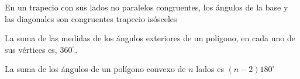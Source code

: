 \begin{teorema}{
En un trapecio con sus lados no paralelos congruentes, los \'angulos de la base
y las diagonales son congruentes
}{trapecio is\'osceles}

\end{teorema}

\begin{teorema}{
La suma de las medidas de los \'angulos exteriores de un pol\'igono, en cada 
uno de sus v\'ertices es, $360^\circ$.
}{}

\end{teorema}
 \begin{teorema}{
La suma de los \'angulos de un pol\'igono convexo de $n$ lados es
$(n-2)180^\circ$
}{}

\end{teorema}      

